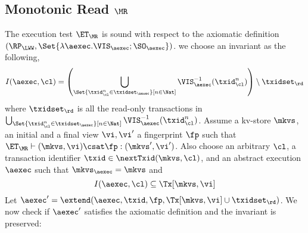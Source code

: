 \subsection{Monotonic Read \( \MR \)}
\label{sec:sound-complete-mr}

The execution test $\ET_\MR$ is sound with respect to the axiomatic definition $(\RP_{\LWW}, \Set{\lambda \aexec. \VIS_{\aexec} ; \SO_{\aexec} })$. 
we choose an invariant as the following,  
\[
    I(\aexec, \cl) = \left( \bigcup_{\Set{\txid_{\cl}^{n} \in \txidset_{\aexec} }[ n \in \Nat]} \VIS_{\aexec}^{-1}(\txid^n_\cl) \right) \setminus \txidset_\rd
\]
where \( \txidset_\rd \) is all the read-only transactions in 
\( \bigcup_{\Set{\txid_{\cl}^{n} \in \txidset_{\aexec} }[ n \in \Nat]} \VIS_{\aexec}^{-1}(\txid^n_\cl) \).
Assume a kv-store $\mkvs$, an initial and a final view $\vi, \vi'$  a fingerprint $\fp$ 
such that $\ET_{\MR} \vdash (\mkvs, \vi) \csat \fp: (\mkvs',\vi')$. 
Also choose an arbitrary $\cl$, a transaction identifier $\txid \in \nextTxid(\mkvs, \cl)$, 
and an abstract execution $\aexec$ such that $\mkvs_{\aexec} = \mkvs$ and 
\begin{equation}
I(\aexec, \cl) \subseteq \Tx[\mkvs, \vi]
\label{eq:mr_invariant}
\end{equation}
Let \( \aexec' = \extend(\aexec, \txid, \fp, \Tx[\mkvs, \vi] \cup \txidset_\rd) \).
We now check if \( \aexec' \) satisfies the axiomatic definition and the invariant is preserved:

